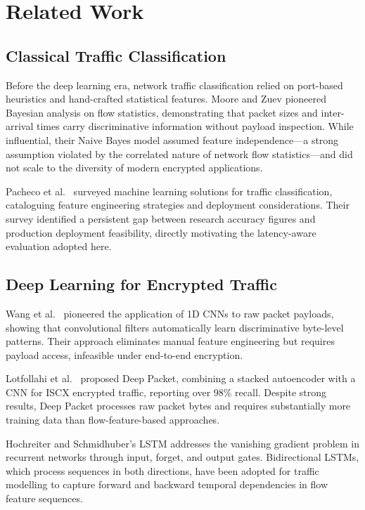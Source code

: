 \documentclass[conference]{IEEEtran}
\begin{document}
\section{Related Work}
\label{sec:related}

\subsection{Classical Traffic Classification}

Before the deep learning era, network traffic classification relied on port-based
heuristics and hand-crafted statistical features. Moore and Zuev
\cite{moore2005} pioneered Bayesian analysis on flow statistics, demonstrating
that packet sizes and inter-arrival times carry discriminative information
without payload inspection. While influential, their Naive Bayes model assumed
feature independence---a strong assumption violated by the correlated nature of
network flow statistics---and did not scale to the diversity of modern encrypted
applications.

Pacheco et al.\ \cite{pacheco2019} surveyed machine learning solutions for
traffic classification, cataloguing feature engineering strategies and
deployment considerations. Their survey identified a persistent gap between
research accuracy figures and production deployment feasibility, directly
motivating the latency-aware evaluation adopted here.

\subsection{Deep Learning for Encrypted Traffic}

Wang et al.\ \cite{wang2017endtoend} pioneered the application of 1D CNNs to
raw packet payloads, showing that convolutional filters automatically learn
discriminative byte-level patterns. Their approach eliminates manual feature
engineering but requires payload access, infeasible under end-to-end encryption.

Lotfollahi et al.\ \cite{lotfollahi2020} proposed Deep Packet, combining a
stacked autoencoder with a CNN for ISCX encrypted traffic, reporting over 98\%
recall. Despite strong results, Deep Packet processes raw packet bytes and
requires substantially more training data than flow-feature-based approaches.

Hochreiter and Schmidhuber's LSTM \cite{hochreiter1997} addresses the vanishing
gradient problem in recurrent networks through input, forget, and output gates.
Bidirectional LSTMs, which process sequences in both directions, have been
adopted for traffic modelling to capture forward and backward temporal
dependencies in flow feature sequences.
\end{document}
